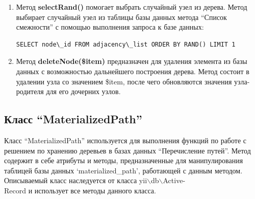 \documentclass[a4paper,14pt]{extreport}
\theoremstyle{definition}
\begin{document}
\begin{enumerate}
\item Метод \textbf{selectRand()} помогает выбрать случайный узел из дерева. Метод выбирает случайный узел из таблицы базы данных метода “Список смежности” с помощью выполнения запроса к базе данных:\begin{verbatim}SELECT node\_id FROM adjacency\_list ORDER BY RAND() LIMIT 1\end{verbatim}
\item Метод \textbf{deleteNode(\$item)} предназначен для удаления элемента из базы данных с возможностью дальнейшего построения дерева.
Метод состоит в удалении узла со значением \$item, после чего обновляются значения узла-родителя для его дочерних узлов.
\end{enumerate}
\subsection{Класс “MaterializedPath”}
Класс “MaterializedPath” используется для выполнения функций по работе с решением по хранению деревьев в базах данных “Перечисление путей”. Метод содержит в себе атрибуты и методы, предназначенные для манипулирования таблицей базы данных ‘materialized\_path’, работающей с данным методом. Описываемый класс наследуется от класса yii$\backslash$db$\backslash$Active-\\Record и использует все методы данного класса.
\end{document}
